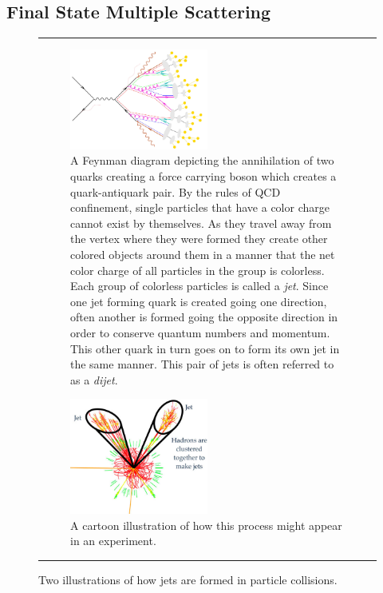 \subsection{Final State Multiple Scattering}
\begin{figure}[hbtp!]
\centering    \rule{35em}{0.5pt}
\begin{subfigure}[]{1\textwidth}\captionsetup{width=1.1\linewidth}
    \centering
    \includegraphics[width=0.5\textwidth]{Figures/jetfeynman.jpg}
\caption{A Feynman diagram\citep{jetfeynmancredit} depicting the annihilation of two quarks creating a force carrying boson which creates a quark-antiquark pair. By the rules of QCD confinement, single particles that have a color charge cannot exist by themselves. As they travel away from the vertex where they were formed they create other colored objects around them in a manner that the net color charge of all particles in the group is colorless. Each group of colorless particles is called a \textit{jet}. Since one jet forming quark is created going one direction, often another is formed going the opposite direction in order to conserve quantum numbers and momentum. This other quark in turn goes on to form its own jet in the same manner. This pair of jets is often referred to as a \textit{dijet}.}
\label{fig:jetfeynman}
\end{subfigure}
\begin{subfigure}[]{1\textwidth}
\captionsetup{width=1.5\linewidth}
    \centering
    \includegraphics[width=0.5\textwidth]{Figures/jetdiagram.jpg}
\caption{A cartoon illustration\citep{jetdiagramcredit} of how this process might appear in an experiment.}
\label{fig:jetdiagram}
\end{subfigure}
\caption[Feynman and Cartoon diagrams of Jet Formation]{Two illustrations of how jets are formed in particle collisions.}
\label{fig:jetformation}    \rule{35em}{0.5pt}
\end{figure}
